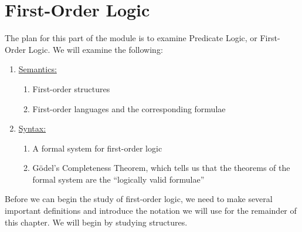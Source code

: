 \chapter{First-Order Logic}

The plan for this part of the module is to examine Predicate Logic, or First-Order Logic. We will examine the following:
\begin{enumerate}
    \item \underline{Semantics:}
    \begin{enumerate}[noitemsep]
        \item First-order structures
        \item First-order languages and the corresponding formulae
    \end{enumerate}

    \item \underline{Syntax:}
    \begin{enumerate}[noitemsep]
        \item A formal system for first-order logic
        \item Gödel's Completeness Theorem, which tells us that the theorems of the formal system are the ``logically valid formulae''
    \end{enumerate}
\end{enumerate}

Before we can begin the study of first-order logic, we need to make several important definitions and introduce the notation we will use for the remainder of this chapter. We will begin by studying structures.


